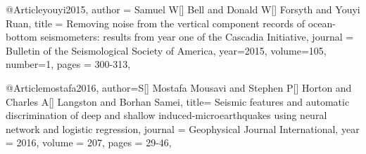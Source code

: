 @Article{youyi2015,
  author =	 {Samuel W[] Bell and Donald W[] Forsyth and Youyi Ruan},
  title =	 {Removing noise from the vertical component records of ocean-bottom seismometers: results from year one of the Cascadia Initiative},
  journal =	 {Bulletin of the Seismological Society of America},
  year=2015,
  volume=105,
  number=1,
  pages =	 {300-313},
}


@Article{mostafa2016,
  author={S[] Mostafa Mousavi and Stephen P[] Horton and Charles A[] Langston and Borhan Samei},
  title={ Seismic features and automatic discrimination of deep and shallow induced-microearthquakes using neural network and logistic regression},
  journal = 	 {Geophysical Journal International},
  year = 	 2016,
  volume =	 207,
  pages =	 {29-46},
}





